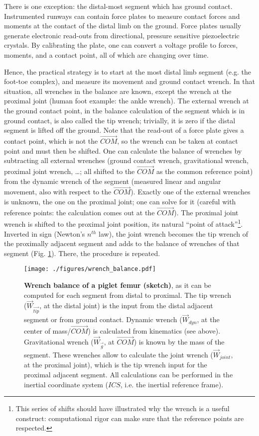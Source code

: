 There is one exception: the distal-most segment which has ground contact.
Instrumented runways can contain force plates to measure contact forces and moments at the contact of the distal limb on the ground.
Force plates usually generate electronic read-outs from directional, pressure sensitive piezoelectric crystals.
By calibrating the plate, one can convert a voltage profile to forces, moments, and a contact point, all of which are changing over time.


Hence, the practical strategy \citep{Robertson2013,Lynch2017,Dumas2004} is to start at the most distal limb segment (e.g. the foot-toe complex), and measure its movement and ground contact wrench.
In that situation, all wrenches in the balance are known, except the wrench at the proximal joint (human foot example: the ankle wrench).
The external wrench at the ground contact point, in the balance calculation of the segment which is in ground contact, is also called the tip wrench; trivially, it is zero if the distal segment is lifted off the ground.
Note that the read-out of a force plate gives a contact point, which is not the \(\vec{COM}\), so the wrench can be taken at contact point and must then be shifted.
One can calculate the balance of wrenches by subtracting all external wrenches (ground contact wrench, gravitational wrench, proximal joint wrench, \ldots{}; all shifted to the \(\vec{COM}\) as the common reference point) from the dynamic wrench of the segment (measured linear and angular movement, also with respect to the \(\vec{COM}\)).
Exactly one of the external wrenches is unknown, the one on the proximal joint; one can solve for it (careful with reference points: the calculation comes out at the \(\vec{COM}\)).
The proximal joint wrench is shifted to the proximal joint position, its natural ``point of attack''\footnote{This series of shifts should have illustrated why the wrench is a useful construct: computational rigor can make sure that the reference points are respected.}.
Inverted in sign (Newton's \(n^{th}\) law), the joint wrench becomes the tip wrench of the proximally adjacent segment and adds to the balance of wrenches of that segment (Fig. \ref{fig:wrenchbalance}).
There, the procedure is repeated.

\begin{figure}[p]
\centering
\texttt{[image: ./figures/wrench\_balance.pdf]}
\caption{\label{fig:wrenchbalance}\textbf{Wrench balance of a piglet femur (sketch)}, as it can be computed for each segment from distal to proximal. The tip wrench (\(\vec{W}_{\vec{tip}}\), at the distal joint) is the input from the distal adjacent segment or from ground contact. Dynamic wrench (\(\vec{W}_{dyn}\), at the center of mass/\(\vec{COM}\)) is calculated from kinematics (see above). Gravitational wrench (\(\vec{W}_{\vec{g}}\), at \(\vec{COM}\)) is known by the mass of the segment. These wrenches allow to calculate the joint wrench (\(\vec{W}_{joint}\), at the proximal joint), which is the tip wrench input for the proximal adjacent segment. All calculations can be performed in the inertial coordinate system (\(ICS\), i.e. the inertial reference frame).}
\end{figure}
